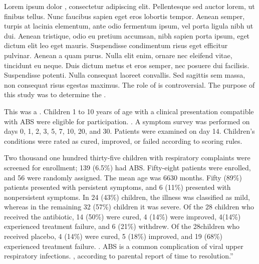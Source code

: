 \documentclass{article}
\begin{document}
Lorem ipsum dolor , consectetur adipiscing elit. Pellentesque sed auctor lorem, ut finibus tellus. Nunc faucibus sapien eget eros lobortis tempor. Aenean semper, turpis at lacinia elementum, ante odio fermentum ipsum, vel porta ligula nibh ut dui. Aenean tristique, odio eu pretium accumsan, nibh sapien porta ipsum, eget dictum elit leo eget mauris. Suspendisse condimentum risus eget efficitur pulvinar. Aenean a quam purus. Nulla elit enim, ornare nec eleifend vitae, tincidunt eu neque. Duis dictum metus et eros semper, nec posuere dui facilisis. Suspendisse potenti. Nulla consequat laoreet convallis. Sed sagittis sem massa, non consequat risus egestas maximus.
The role of  is controversial.
The purpose of this study was to determine the .

This was a .
Children 1 to 10 years of age with a clinical presentation compatible with ABS were eligible for participation.
.
A symptom survey was performed on days 0, 1, 2, 3, 5, 7, 10, 20, and 30.
Patients were examined on day 14.
Children’s conditions were rated as cured, improved, or failed according to scoring rules.

Two thousand one hundred thirty-five children with respiratory complaints were screened for enrollment; 139 (6.5\%) had ABS.
Fifty-eight patients were enrolled, and 56 were randomly assigned. The mean age was 6630 months.
Fifty (89\%) patients presented with persistent symptoms, and 6 (11\%) presented with nonpersistent symptoms.
In 24 (43\%) children, the illness was classified as mild, whereas in the remaining 32 (57\%) children it was severe.
Of the 28 children who received the antibiotic, 14 (50\%) were cured, 4 (14\%) were improved, 4(14\%) experienced treatment failure, and 6 (21\%) withdrew.
Of the 28children who received placebo, 4 (14\%) were cured, 5 (18\%) improved, and 19 (68\%) experienced treatment failure.
.
ABS is a common complication of viral upper respiratory infections. , according to parental report of time to resolution.”
\end{document}
